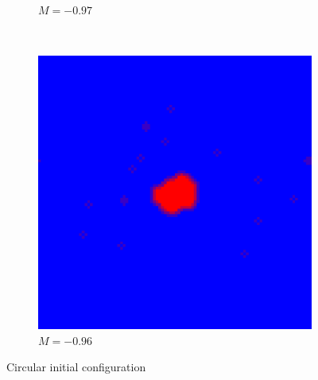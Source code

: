 \documentclass[a4paper,12pt]{article}
\theoremstyle{plain}
\theoremstyle{definition}
\begin{document}
\begin{figure}[H]
\begin{subfigure}[t]{0.3\textwidth}
              \caption*{$M=-0.97$}
          \end{subfigure}
          ~
          \begin{subfigure}[t]{0.3\textwidth}
            \includegraphics[width=\textwidth]{396c.png}
             \caption*{$M=-0.96$}
          \end{subfigure}
          \caption*{Circular initial configuration}
      \end{figure}
            
\end{document}
